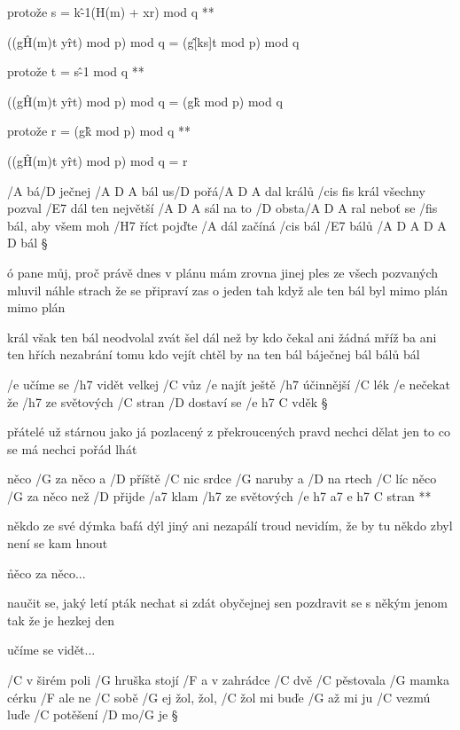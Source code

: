 \R protože s = k\^{-1}(H(m) + xr) mod q **

((g\^{H(m)t} y\^{rt}) mod p) mod q = 
(g\^{[ks]t} mod p) mod q

\R protože t = s\^{-1} mod q **

((g\^{H(m)t} y\^{rt}) mod p) mod q = 
(g\^k mod p) mod q

\R protože r = (g\^k mod p) mod q **

((g\^{H(m)t} y\^{rt}) mod p) mod q = r




/A bá/D ječnej /{A D A} bál \quad us/D pořá/{A D A} dal
králů /{cis fis} král všechny pozval /E7 dál
ten největší /{A D A} sál \quad na to /D obsta/{A D A} ral
neboť se /fis bál, aby všem moh /H7 říct
pojďte /A dál začíná /cis bál
/E7 bálů /{A D A D A D} bál \S

ó pane můj, proč právě dnes
v plánu mám zrovna jinej ples
ze všech pozvaných mluvil náhle strach
že se připraví zas o jeden tah
když ale ten bál byl mimo plán
mimo plán \s

král však ten bál neodvolal
zvát šel dál než by kdo čekal
ani žádná mříž ba ani ten hřích
nezabrání tomu kdo vejít
chtěl by na ten bál báječnej bál
bálů bál



/e učíme se /h7 vidět velkej /C vůz
/e najít ještě /h7 účinnější /C lék
/e nečekat že /h7 ze světových /C stran
/D dostaví se /{e h7 C} vděk \S

přátelé už stárnou jako já
pozlacený z překroucených pravd
nechci dělat jen to co se má
nechci pořád lhát

\R  něco /G za něco a /D příště /C nic
    srdce /G naruby a /D na rtech /C líc
    něco /G za něco než /D přijde /a7 klam
    /h7 ze světových /{e h7 a7 e h7 C} stran **

někdo ze své dýmka bafá dýl
jiný ani nezapálí troud
nevidím, že by tu někdo zbyl
není se kam hnout

\r  něco za něco...

naučit se, jaký letí pták
nechat si zdát obyčejnej sen
pozdravit se s někým jenom tak
že je hezkej den

\rr

učíme se vidět...



/C v širém poli /G hruška stojí /F a v zahrádce /C dvě
/C pěstovala /G mamka cérku /F ale ne /C sobě
/G ej žol, žol, /C žol mi buďe /G až mi ju /C vezmú luďe
/C potěšení /D mo/G je \S

